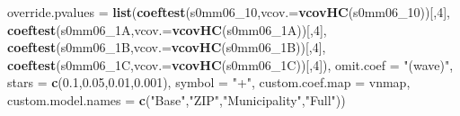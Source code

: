 \documentclass[
]{article}
\newenvironment{Shaded}{\begin{snugshade}}{\end{snugshade}}
\newcommand{\DataTypeTok}[1]{\textcolor[rgb]{0.13,0.29,0.53}{#1}}
\newcommand{\DecValTok}[1]{\textcolor[rgb]{0.00,0.00,0.81}{#1}}
\newcommand{\FloatTok}[1]{\textcolor[rgb]{0.00,0.00,0.81}{#1}}
\newcommand{\KeywordTok}[1]{\textcolor[rgb]{0.13,0.29,0.53}{\textbf{#1}}}
\newcommand{\NormalTok}[1]{#1}
\newcommand{\StringTok}[1]{\textcolor[rgb]{0.31,0.60,0.02}{#1}}
\begin{document}
\begin{Shaded}
\begin{Highlighting}[]
          \DataTypeTok{override.pvalues =} \KeywordTok{list}\NormalTok{(}\KeywordTok{coeftest}\NormalTok{(s0mm06_}\DecValTok{10}\NormalTok{,}\DataTypeTok{vcov.=}\KeywordTok{vcovHC}\NormalTok{(s0mm06_}\DecValTok{10}\NormalTok{))[,}\DecValTok{4}\NormalTok{],}
                                  \KeywordTok{coeftest}\NormalTok{(s0mm06_1A,}\DataTypeTok{vcov.=}\KeywordTok{vcovHC}\NormalTok{(s0mm06_1A))[,}\DecValTok{4}\NormalTok{],}
                                  \KeywordTok{coeftest}\NormalTok{(s0mm06_1B,}\DataTypeTok{vcov.=}\KeywordTok{vcovHC}\NormalTok{(s0mm06_1B))[,}\DecValTok{4}\NormalTok{],}
                                  \KeywordTok{coeftest}\NormalTok{(s0mm06_1C,}\DataTypeTok{vcov.=}\KeywordTok{vcovHC}\NormalTok{(s0mm06_1C))[,}\DecValTok{4}\NormalTok{]),}
          \DataTypeTok{omit.coef =} \StringTok{"(wave)"}\NormalTok{, }\DataTypeTok{stars =} \KeywordTok{c}\NormalTok{(}\FloatTok{0.1}\NormalTok{,}\FloatTok{0.05}\NormalTok{,}\FloatTok{0.01}\NormalTok{,}\FloatTok{0.001}\NormalTok{), }\DataTypeTok{symbol =} \StringTok{"+"}\NormalTok{,}
          \DataTypeTok{custom.coef.map =}\NormalTok{ vnmap, }
          \DataTypeTok{custom.model.names =} \KeywordTok{c}\NormalTok{(}\StringTok{"Base"}\NormalTok{,}\StringTok{"ZIP"}\NormalTok{,}\StringTok{"Municipality"}\NormalTok{,}\StringTok{"Full"}\NormalTok{))}
\end{Highlighting}
\end{Shaded}
\end{document}

